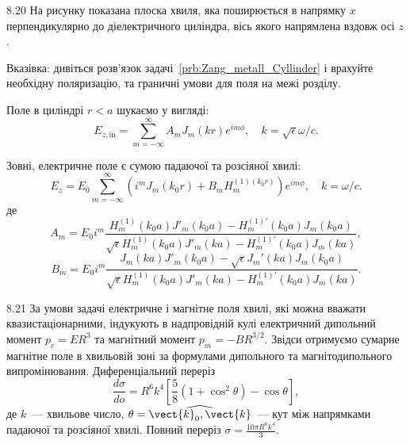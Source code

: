\begin{Solution}{8.{20}}
На рисунку показана плоска хвиля, яка поширюється в напрямку $x$ перпендикулярно до діелектричного циліндра, вісь якого напрямлена вздовж осі $z$.

	\begin{center}
	\end{center}

	Вказівка: дивіться розв'язок задачі~\ref{prb:Zang_metall_Cyllinder} і врахуйте необхідну поляризацію, та граничні умови для поля на межі розділу.

	Поле в циліндрі $r < a$ шукаємо у вигляді:
	\[
		E_{z,\text{in}} = \sum\limits_{m = -\infty}^{\infty}A_mJ_m(kr)e^{im\phi}, \quad k=\sqrt{\epsilon} \omega/c.
	\]

	Зовні, електричне поле є сумою падаючої та розсіяної хвилі:
	\[
		E_z = E_0 \sum\limits_{m = -\infty}^{\infty} \left( i^m J_m(k_0 r) + B_m H_m^{(1)(k_0r)} \right) e^{im\phi}, \quad k= \omega/c.
	\]
	де
	\[
		A_m = E_0i^m \frac{  H_m^{(1)}(k_0a) J'_m(k_0a) - H_m^{(1)\prime}(k_0a) J_m(k_0a)    }{ \sqrt{\epsilon} H_m^{(1)}(k_0a) J'_m(ka) - H_m^{(1)\prime}(k_0a) J_m(ka)},
	\]
	\[
		B_m = E_0i^m \frac{  J_m(ka) J'_m(k_0a) - \sqrt{\epsilon} J_m'(ka) J_m(k_0a)    }{ \sqrt{\epsilon} H_m^{(1)}(k_0a) J'_m(ka) - H_m^{(1)\prime}(k_0a) J_m(ka)}.
	\]

\end{Solution}
\begin{Solution}{8.{21}}
    За умови задачі  електричне і магнітне поля хвилі, які можна вважати квазистаціонарними, індукують в надпровідній кулі електричний дипольний момент $p_e=ER^3$ та магнітний момент $p_m=-BR^{3/2}$. Звідси отримуємо сумарне магнітне поле в хвильовій зоні за формулами дипольного та магнітодипольного випромінювання.
	Диференціальний переріз
	\[
		\frac{d\sigma}{do} = R^6 k^4 \left[\frac58 (1 + \cos^2\theta) -\cos\theta\right],
	\]
	де $k$~--- хвильове число, $\theta = \widehat{\vect{k}_0,\vect{k}}$~--- кут між напрямками падаючої та розсіяної хвилі.
	Повний переріз $\sigma = \frac{10\pi R^6 k^4}{3}$.
\end{Solution}
